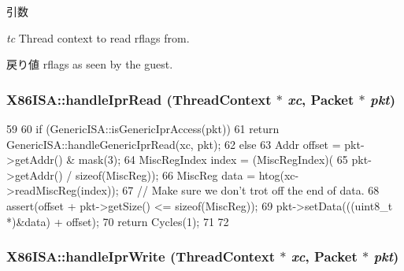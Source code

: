 \begin{DoxyParams}{引数}
\item[{\em tc}]Thread context to read rflags from. \end{DoxyParams}
\begin{DoxyReturn}{戻り値}
rflags as seen by the guest. 
\end{DoxyReturn}
\hypertarget{namespaceX86ISA_a23dd7789afdb4f219d0c126238ef8052}{
\subsubsection[{handleIprRead}]{ X86ISA::handleIprRead ({\bf ThreadContext} $\ast$ {\em xc}, \/  {\bf Packet} $\ast$ {\em pkt})}}
\label{namespaceX86ISA_a23dd7789afdb4f219d0c126238ef8052}



\begin{DoxyCode}
59     {
60         if (GenericISA::isGenericIprAccess(pkt)) {
61             return GenericISA::handleGenericIprRead(xc, pkt);
62         } else {
63             Addr offset = pkt->getAddr() & mask(3);
64             MiscRegIndex index = (MiscRegIndex)(
65                 pkt->getAddr() / sizeof(MiscReg));
66             MiscReg data = htog(xc->readMiscReg(index));
67             // Make sure we don't trot off the end of data.
68             assert(offset + pkt->getSize() <= sizeof(MiscReg));
69             pkt->setData(((uint8_t *)&data) + offset);
70             return Cycles(1);
71         }
72     }
\end{DoxyCode}
\hypertarget{namespaceX86ISA_aa42813d6b9ccfb0d9d72d0a96d923106}{
\subsubsection[{handleIprWrite}]{ X86ISA::handleIprWrite ({\bf ThreadContext} $\ast$ {\em xc}, \/  {\bf Packet} $\ast$ {\em pkt})}}
\label{namespaceX86ISA_aa42813d6b9ccfb0d9d72d0a96d923106}



